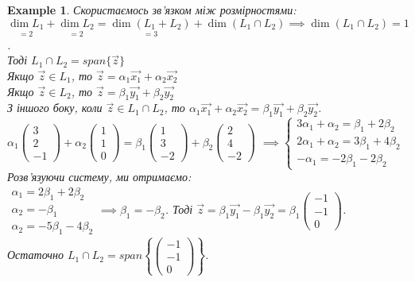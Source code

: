 \documentclass[a4paper, 10pt]{article}
\theoremstyle{theoremdd}
\newtheorem{example}[theorem]{Example}
\begin{document}
\begin{example}
	Скористаємось зв'язком між розмірностями:\\
	$\underset{=2}{\dim L_1} + \underset{=2}{\dim L_2} = \underset{=3}{\dim (L_1+L_2)} + \dim(L_1 \cap L_2) \implies \dim (L_1 \cap L_2) = 1$.\\
	Тоді $L_1 \cap L_2 = span\{\vec{z}\}$\\
	Якщо $\vec{z} \in L_1$, то $\vec{z} = \alpha_1 \vec{x_1} + \alpha_2 \vec{x_2}$\\
	Якщо $\vec{z} \in L_2$, то $\vec{z} = \beta_1 \vec{y_1} + \beta_2 \vec{y_2}$\\
	З іншого боку, коли $\vec{z} \in L_1 \cap L_2$, то $\alpha_1 \vec{x_1} + \alpha_2 \vec{x_2} = \beta_1 \vec{y_1} + \beta_2 \vec{y_2}$.\\
	$\alpha_1 \begin{pmatrix} 3 \\ 2 \\ -1 \end{pmatrix} + \alpha_2 \begin{pmatrix} 1 \\ 1 \\ 0 \end{pmatrix} = \beta_1 \begin{pmatrix} 1 \\ 3 \\ -2 \end{pmatrix} + \beta_2 \begin{pmatrix} 2 \\ 4 \\ -2 \end{pmatrix}$
	$\implies \begin{cases}
	3 \alpha_1 + \alpha_2 = \beta_1 + 2 \beta_2 \\
	2 \alpha_1 + \alpha_2 = 3 \beta_1 + 4 \beta_2 \\
	- \alpha_1 = -2 \beta_1 - 2 \beta_2
	\end{cases}$\\
	Розв'язуючи систему, ми отримаємо:\\
	$\begin{gathered}
	\alpha_1 = 2\beta_1 + 2\beta_2 \\
	\alpha_2 = -\beta_1 \\
	\alpha_2 = -5\beta_1 - 4\beta_2
	\end{gathered} \implies \beta_1 = -\beta_2$. Тоді $\vec{z} =\beta_1 \vec{y_1} - \beta_1 \vec{y_2} = \beta_1 \begin{pmatrix} -1 \\ -1 \\ 0 \end{pmatrix}$.\\
	Остаточно $L_1 \cap L_2 = span\left\{ \begin{pmatrix} -1 \\ -1 \\ 0 \end{pmatrix} \right\}$.
	\end{example}
	
\end{document}
